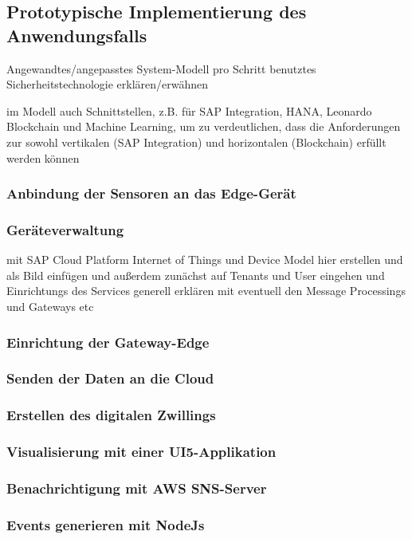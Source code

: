 \subsection{Prototypische Implementierung des Anwendungsfalls}
Angewandtes/angepasstes System-Modell
pro Schritt benutztes Sicherheitstechnologie erklären/erwähnen

im Modell auch Schnittstellen, z.B. für SAP Integration, HANA, Leonardo Blockchain und Machine Learning, um zu verdeutlichen, dass die Anforderungen zur sowohl vertikalen (SAP Integration) und horizontalen (Blockchain) erfüllt werden können

\subsubsection{Anbindung der Sensoren an das Edge-Gerät}

\subsubsection{Geräteverwaltung}
mit SAP Cloud Platform Internet of Things und Device Model hier erstellen und als Bild einfügen und außerdem
zunächst auf Tenants und User eingehen und Einrichtungs des Services generell erklären mit eventuell den Message Processings
und Gateways etc

\subsubsection{Einrichtung der Gateway-Edge}

\subsubsection{Senden der Daten an die Cloud}

\subsubsection{Erstellen des digitalen Zwillings}

\subsubsection{Visualisierung mit einer UI5-Applikation}

\subsubsection{Benachrichtigung mit AWS SNS-Server}

\subsubsection{Events generieren mit NodeJs}

\newpage
